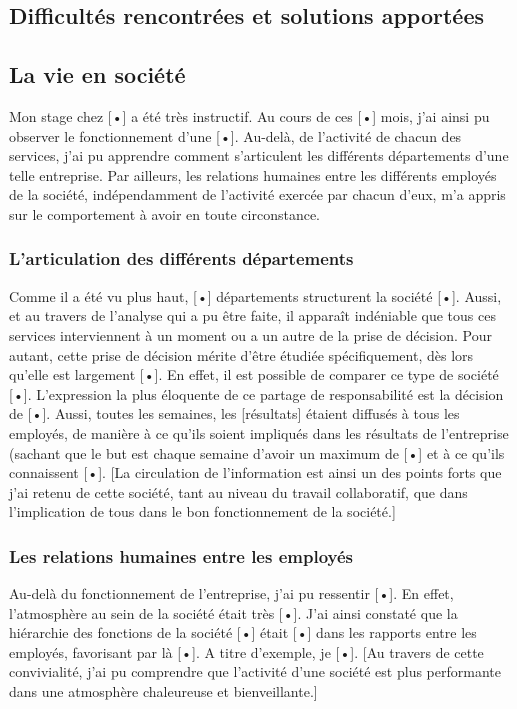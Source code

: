 \documentclass[11pt]{article}
\begin{document}
		\subsection{Difficultés rencontrées et solutions apportées}
		\subsection{La vie en société}
		Mon stage chez [•] a été très instructif. Au cours de ces [•] mois, j’ai ainsi pu observer le fonctionnement 
		d’une [•]. Au-delà, de l’activité de chacun des services, j’ai pu apprendre comment s’articulent les différents 
		départements d’une telle entreprise. Par ailleurs, les relations humaines entre les différents employés de la 
		société, indépendamment de l’activité exercée par chacun d’eux, m’a appris sur le comportement à avoir en toute 
		circonstance.
			\subsubsection{L’articulation des différents départements}
			Comme il a été vu plus haut, [•] départements structurent la société [•]. Aussi, et au travers de l’analyse 
			qui a pu être faite, il apparaît indéniable que tous ces services interviennent à un moment ou a un autre de 
			la prise de décision. Pour autant, cette prise de décision mérite d’être étudiée spécifiquement, dès lors 
			qu’elle est largement [•]. En effet, il est possible de comparer ce type de société [•].
			L’expression la plus éloquente de ce partage de responsabilité est la décision de [•].
			Aussi, toutes les semaines, les [résultats]  étaient diffusés à tous les employés, de manière à ce qu’ils 
			soient impliqués dans les résultats de l’entreprise (sachant que le but est chaque semaine d’avoir un maximum 
			de [•] et à ce qu’ils connaissent [•].
			[La circulation de l’information est ainsi un des points forts que j’ai retenu de cette société, tant au 
			niveau du travail collaboratif, que dans l’implication de tous dans le bon fonctionnement de la société.]
			\subsubsection{Les relations humaines entre les employés}
			Au-delà du fonctionnement de l’entreprise, j’ai pu ressentir [•].
			En effet, l’atmosphère au sein de la société était très [•]. J’ai ainsi constaté que la hiérarchie des 
			fonctions de la société [•] était [•] dans les rapports entre les employés, favorisant par là [•].
			A titre d’exemple, je [•].
			[Au travers de cette convivialité, j’ai pu comprendre que l’activité d’une société est plus performante 
			dans une atmosphère chaleureuse et bienveillante.]
\newpage
{}
\end{document}
